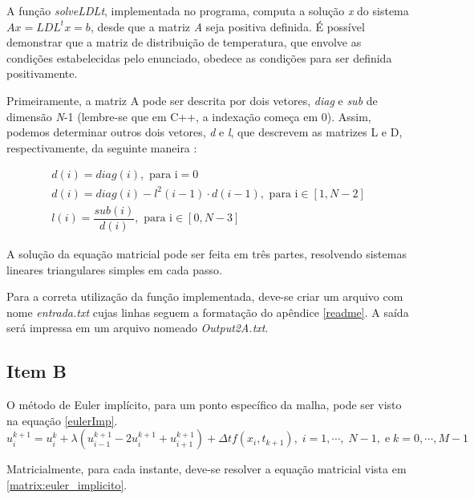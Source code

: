 \documentclass[12pt]{article}
\begin{document}
\begin{spacing}{1.5}
A função \textit{solveLDLt}, implementada no programa, computa a solução \textit{x} do sistema $Ax = LDL^{t}x = b$, desde que a matriz \textit{A} seja positiva definida. É possível demonstrar \supercite{heat} que a matriz de distribuição de temperatura, que envolve as condições estabelecidas pelo enunciado, obedece as condições para ser definida positivamente.

Primeiramente, a matriz A pode ser descrita por dois vetores, \textit{diag} e \textit{sub} de dimensão \textit{N}-1 (lembre-se que em C++, a indexação começa em 0). Assim, podemos determinar outros dois vetores, \textit{d} e \textit{l}, que descrevem as matrizes L e D, respectivamente, da seguinte maneira \supercite{cholesky}:

\begin{gather}
    d(i) = diag(i), \text{ para i}= 0 \\
    d(i) = diag(i) - l^2(i-1)\cdot d(i-1), \text{ para i} \in [1, \textit{N}-2] \\
    l(i) = \dfrac{sub(i)}{d(i)}, \text{ para i} \in [0, \textit{N}-3]
\end{gather}

A solução da equação matricial pode ser feita em três partes, resolvendo sistemas lineares triangulares simples em cada passo. 

Para a correta utilização da função implementada, deve-se criar um arquivo com nome \textit{entrada.txt} cujas linhas seguem a formatação do apêndice \ref{readme}. A saída será impressa em um arquivo nomeado \textit{Output2A.txt}.

\subsection{Item B}

O método de Euler implícito, para um ponto específico da malha, pode ser visto na equação \eqref{eulerImp}.
\setlength{\abovedisplayskip}{0.2cm}
\setlength{\belowdisplayskip}{0.2cm}
\begin{equation} \label{eulerImp}
u_{i}^{k+1} = u_i^k + \lambda(u^{k+1}_{i-1} - 2u^{k+1}_{i} + u_{i+1}^{k+1}) + \Delta t f(x_{i},t_{k+1}), \; i = 1,\cdots ,\; \textit{N}-1, \;\text{e} \; k = 0, \cdots, \textit{M}-1\;
\end{equation}

Matricialmente, para cada instante, deve-se resolver a equação matricial vista em \eqref{matrix:euler_implicito}.


\end{spacing}
\end{document}
